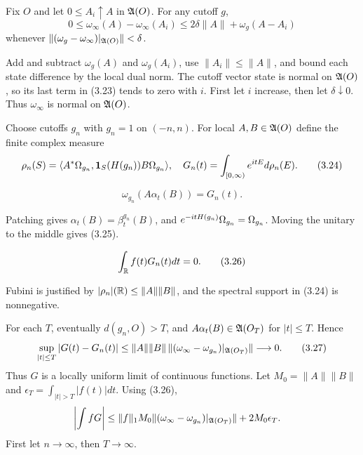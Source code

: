 \documentclass[11pt,a4paper]{article}
\begin{document}
Fix $O$ and let $0\leq A_i\uparrow A$ in $\mathfrak A(O)$.  For any cutoff $g$,
\[
 0\leq\omega_\infty(A)-\omega_\infty(A_i)
 \leq2\delta\|A\|+\omega_g(A-A_i)                                 \tag{3.23}
\]
whenever $\|(\omega_g-\omega_\infty)|_{\mathfrak A(O)}\|<\delta$.

\Because Add and subtract $\omega_g(A)$ and $\omega_g(A_i)$, use
$\|A_i\|\leq\|A\|$, and bound each state difference by the local dual norm.
The cutoff vector state is normal on $\mathfrak A(O)$, so its last term in (3.23) tends to
zero with $i$.  First let $i$ increase, then let $\delta\downarrow0$.  Thus
$\omega_\infty$ is normal on $\mathfrak A(O)$.


Choose cutoffs $g_n$ with $g_n=1$ on $(-n,n)$.  For local
$A,B\in\mathfrak A(O)$ define the finite complex measure
\[
 \rho_n(S)=\langle A^*\Omega_{g_n},\mathbf1_S(H(g_n))B\Omega_{g_n}\rangle,
 \quad G_n(t)=\int_{[0,\infty)}e^{itE}d\rho_n(E).                  \tag{3.24}
\]

\[
 \omega_{g_n}(A\alpha_t(B))=G_n(t).                               \tag{3.25}
\]

\Because Patching gives $\alpha_t(B)=\beta_t^{g_n}(B)$, and
$e^{-itH(g_n)}\Omega_{g_n}=\Omega_{g_n}$.  Moving the unitary to the middle gives (3.25).

\LS{2}{2}{If $f\in L^1(\R)$ and
$\check f(E)=\int f(t)e^{itE}dt$ vanishes on $[0,\infty)$, then}
\[
 \int_\mathbb R f(t)G_n(t)dt=0.                                         \tag{3.26}
\]

\Because Fubini is justified by
$|\rho_n|(\mathbb R)\leq\|A\|\|B\|$, and the spectral support in (3.24) is nonnegative.


\Because For each $T$, eventually $d(g_n,O)>T$, and
$A\alpha_t(B)\in\mathfrak A(O_T)$ for $|t|\leq T$.  Hence
\[
 \sup_{|t|\leq T}|G(t)-G_n(t)|
 \leq\|A\|\|B\|\,
 \|(\omega_\infty-\omega_{g_n})|_{\mathfrak A(O_T)}\|\longrightarrow0.     \tag{3.27}
\]
Thus $G$ is a locally uniform limit of continuous functions.  Let
$M_0=\|A\|\|B\|$ and $\epsilon_T=\int_{|t|>T}|f(t)|dt$.  Using (3.26),
\begin{align*}
 \left|\int fG\right|
 &\leq \|f\|_1M_0
 \|(\omega_\infty-\omega_{g_n})|_{\mathfrak A(O_T)}\|+2M_0\epsilon_T.
\end{align*}
First let $n\to\infty$, then $T\to\infty$.

\end{document}

